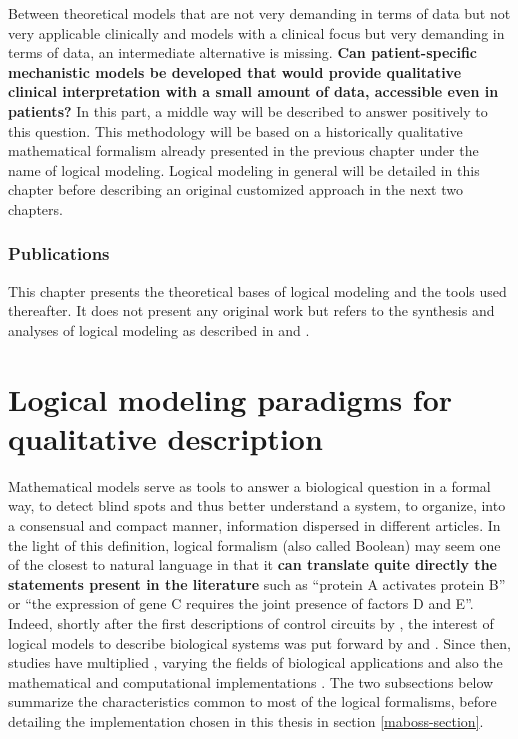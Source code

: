 \documentclass[a4paper,12pt,twoside,onecolumn,openright,final,oldfontcommands]{memoir}
\let\BeginKnitrBlock\begin \let\EndKnitrBlock\end
\begin{document}
Between theoretical models that are not very demanding in terms of data
but not very applicable clinically and models with a clinical focus but
very demanding in terms of data, an intermediate alternative is missing.
\textbf{Can patient-specific mechanistic models be developed that would
provide qualitative clinical interpretation with a small amount of data,
accessible even in patients?} In this part, a middle way will be
described to answer positively to this question. This methodology will
be based on a historically qualitative mathematical formalism already
presented in the previous chapter under the name of logical modeling.
Logical modeling in general will be detailed in this chapter before
describing an original customized approach in the next two chapters.

\BeginKnitrBlock{summarybox}
\subsubsection*{Publications}\label{publications}

This chapter presents the theoretical bases of logical modeling and the
tools used thereafter. It does not present any original work but refers
to the synthesis and analyses of logical modeling as described in
\citet{beal2019personalization} and \citet{beal2020modelisation}.
\EndKnitrBlock{summarybox}

\section{Logical modeling paradigms for qualitative
description}\label{logical-modeling-paradigms-for-qualitative-description}

Mathematical models serve as tools to answer a biological question in a
formal way, to detect blind spots and thus better understand a system,
to organize, into a consensual and compact manner, information dispersed
in different articles. In the light of this definition, logical
formalism (also called Boolean) may seem one of the closest to natural
language in that it \textbf{can translate quite directly the statements
present in the literature} such as ``protein A activates protein B'' or
``the expression of gene C requires the joint presence of factors D and
E''. Indeed, shortly after the first descriptions of control circuits by
\citet{jacob1961genetic}, the interest of logical models to describe
biological systems was put forward by \citet{kauffman1969homeostasis}
and \citet{thomas1973boolean}. Since then, studies have multiplied
\citep{thomas1990biological}, varying the fields of biological
applications and also the mathematical and computational implementations
\citep{naldi2018colomoto}. The two subsections below summarize the
characteristics common to most of the logical formalisms, before
detailing the implementation chosen in this thesis in section
\ref{maboss-section}.
\end{document}
